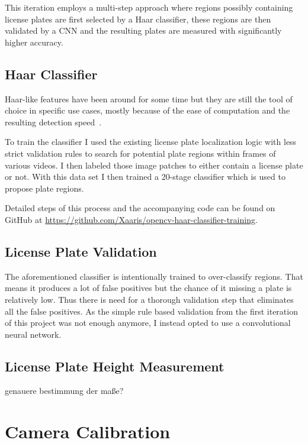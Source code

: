This iteration employs a multi-step approach where regions possibly containing license plates are first selected by a Haar classifier, these regions are then validated by a CNN and the resulting plates are measured with significantly higher accuracy.

\subsection{Haar Classifier}

Haar-like features have been around for some time but they are still the tool of choice in specific use cases, mostly because of the ease of computation and the resulting detection speed~\cite{Viola2001}.

To train the classifier I used the existing license plate localization logic with less strict validation rules to search for potential plate regions within frames of various videos.
I then labeled those image patches to either contain a license plate or not.
With this data set I then trained a 20-stage classifier which is used to propose plate regions.

Detailed steps of this process and the accompanying code can be found on GitHub at \href{https://github.com/Xaaris/opencv-haar-classifier-training}{https://github.com/Xaaris/opencv-haar-classifier-training}.


\subsection{License Plate Validation}
The aforementioned classifier is intentionally trained to over-classify regions.
That means it produces a lot of false positives but the chance of it missing a plate is relatively low.
Thus there is need for a thorough validation step that eliminates all the false positives.
As the simple rule based validation from the first iteration of this project was not enough anymore, I instead opted to use a convolutional neural network.

\subsection{License Plate Height Measurement}

genauere bestimmung der maße?




\section{Camera Calibration}

